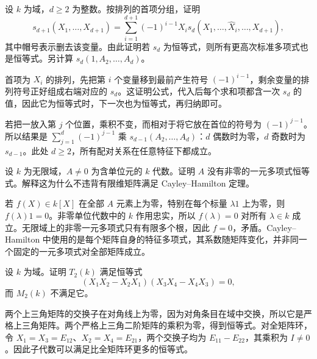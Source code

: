 \begin{optionalexercise}\label{b2:ex:19-standard-recursion}
	设 \(k\) 为域，\(d\ge2\) 为整数。按排列的首项分组，证明
	\[
		s_{d+1}(X_1,\ldots,X_{d+1}) =\sum_{i=1}^{d+1}(-1)^{i-1}X_i s_d(X_1,\ldots,\widehat X_i,\ldots,X_{d+1}),
	\]
	其中帽号表示删去该变量。由此证明若 \(s_d\) 为恒等式，则所有更高次标准多项式也是恒等式。另计算 \(s_d(1,A_2,\ldots,A_d)\)。
\end{optionalexercise}
\begin{solution}
	首项为 \(X_i\) 的排列，先把第 \(i\) 个变量移到最前产生符号 \((-1)^{i-1}\)，剩余变量的排列符号正好组成右端对应的 \(s_d\)。这证明公式，代入后每个求和项都含一次 \(s_d\) 的值，因此它为恒等式时，下一次也为恒等式，再归纳即可。

	若把一放入第 \(j\) 个位置，乘积不变，而相对于将它放在首位的符号为 \((-1)^{j-1}\)。所以结果是 \(\sum_{j=1}^d(-1)^{j-1}\) 乘 \(s_{d-1}(A_2,\ldots,A_d)\)：\(d\) 偶数时为零，\(d\) 奇数时为 \(s_{d-1}\)。此处 \(d\ge2\)，所有配对关系在任意特征下都成立。
\end{solution}

\begin{optionalexercise}\label{b2:ex:19-no-one-variable-identity}
	设 \(k\) 为无限域，\(A\ne0\) 为含单位元的 \(k\) 代数。证明 \(A\) 没有非零的一元多项式恒等式。解释这为什么不违背有限维矩阵满足 Cayley–Hamilton 定理。
\end{optionalexercise}
\begin{solution}
	若 \(f(X)\in k[X]\) 在全部 \(A\) 元素上为零，特别在每个标量 \(\lambda1\) 上为零，则 \(f(\lambda)1=0\)。非零单位代数中的 \(k\) 作用忠实，所以 \(f(\lambda)=0\) 对所有 \(\lambda\in k\) 成立。无限域上的非零一元多项式只有有限多个根，因此 \(f=0\)，矛盾。Cayley–Hamilton 中使用的是每个矩阵自身的特征多项式，其系数随矩阵变化，并非同一个固定的一元多项式对全部矩阵成立。
\end{solution}

\begin{optionalexercise}\label{b2:ex:19-triangular-pi}
	设 \(k\) 为域。证明 \(T_2(k)\) 满足恒等式
	\[
		(X_1X_2-X_2X_1)(X_3X_4-X_4X_3)=0,
	\]
	而 \(M_2(k)\) 不满足它。
\end{optionalexercise}
\begin{solution}
	两个上三角矩阵的交换子在对角线上为零，因为对角条目在域中交换，所以它是严格上三角矩阵。两个严格上三角二阶矩阵的乘积为零，得到恒等式。对全矩阵环，令 \(X_1=X_3=E_{12}\)、\(X_2=X_4=E_{21}\)，两个交换子均为 \(E_{11}-E_{22}\)，其乘积为 \(I\ne0\)。因此子代数可以满足比全矩阵环更多的恒等式。
\end{solution}

